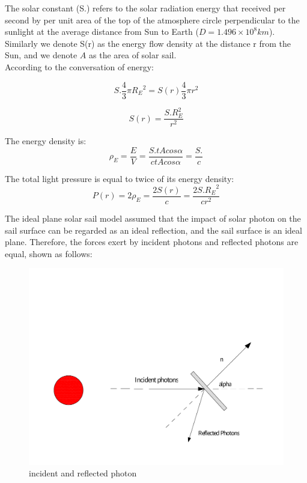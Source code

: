 \documentclass[../Paper.tex]{subfiles}
\begin{document}
The solar constant (S.) refers to the solar radiation energy that received per second by per unit area of the top of the atmosphere circle perpendicular to the sunlight at the average distance from Sun to Earth ($D=1.496\times10^8km$). Similarly we denote S(r) as the energy flow density at the distance r from the Sun, and we denote $A$ as the area of solar sail.
\\

According to the conversation of energy:

\[S.\dfrac{4}{3}\pi{R_E}^2=S(r)\dfrac{4}{3}\pi r^2\]

\begin{equation}
S(r)=\dfrac{S.R_E^2}{r^2}
\end{equation}

The energy density is:\\
\begin{equation}
\rho_E=\dfrac{E}{V}=\dfrac{S.tAcos\alpha}{c tAcos\alpha}=\dfrac{S.}{c}
\end{equation}

The total light pressure is equal to twice of its energy density:
\begin{equation}
P(r)=2\rho_E=\dfrac{2S(r)}{c}=\dfrac{2S.{R_E}^2}{cr^2}
\end{equation}

The ideal plane solar sail model assumed that the impact of solar photon on the sail surface can be regarded as an ideal reflection, and the sail surface is an ideal plane. Therefore, the forces exert by incident photons and reflected photons are equal, shown as follows:

\begin{figure}[H]
 \centering
 \includegraphics[scale=0.3]{../Figures/lightpressure.pdf}
 \caption{incident and reflected photon}
\end{figure}
\end{document}
